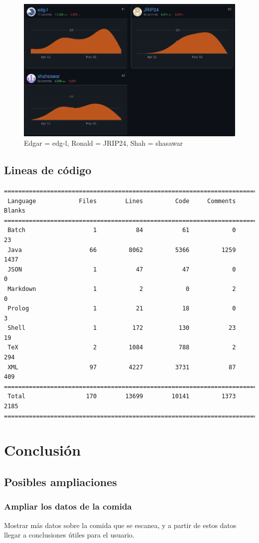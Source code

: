 \documentclass[12pt,a4paper]{article}
\begin{document}
\begin{figure}[h]
 	\centering
	\includegraphics[width=\textwidth]{git-contributors}
	\caption{Edgar = edg-l, Ronald = JRIP24, Shah = shasawar}
\end{figure}

\subsection{Lineas de código}

\begin{verbatim}
===============================================================================
 Language            Files        Lines         Code     Comments       Blanks
===============================================================================
 Batch                   1           84           61            0           23
 Java                   66         8062         5366         1259         1437
 JSON                    1           47           47            0            0
 Markdown                1            2            0            2            0
 Prolog                  1           21           18            0            3
 Shell                   1          172          130           23           19
 TeX                     2         1084          788            2          294
 XML                    97         4227         3731           87          409
===============================================================================
 Total                 170        13699        10141         1373         2185
===============================================================================
\end{verbatim}

\newpage

\section{Conclusión}

\subsection{Posibles ampliaciones}

\subsubsection{Ampliar los datos de la comida}
Mostrar más datos sobre la comida que se escanea, y a partir de estos datos llegar a conclusiones útiles para el usuario.
\end{document}
